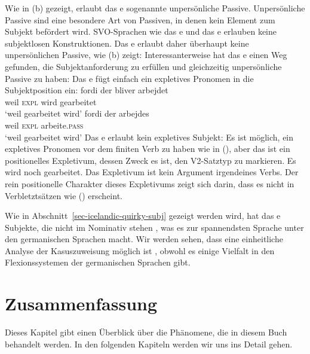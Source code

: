 Wie in (b) gezeigt, erlaubt das e sogenannte unpersönliche Passive. Unpersönliche Passive sind
eine besondere Art von Passiven, in denen kein Element zum Subjekt befördert wird. SVO-Sprachen wie das e und
das e erlauben keine subjektlosen Konstruktionen. Das e erlaubt daher überhaupt keine unpersönlichen Passive,
wie (b) zeigt:
\eal
{}
\zl
Interessanterweise hat das e einen Weg gefunden, die Subjektanforderung zu erfüllen und gleichzeitig
unpersönliche Passive zu haben: Das e fügt einfach ein expletives Pronomen in die Subjektposition ein:
\eal
\label{ex-bliver-arbejder}
\ex
\gll fordi der bliver arbejdet\\
     weil \textsc{expl} wird gearbeitet\\\danish
\glt `weil gearbeitet wird'
\ex
\gll fordi   der arbejdes\\
     weil  \textsc{expl} arbeite.\textsc{pass}\\
\glt `weil gearbeitet wird'
\zl
Das e erlaubt kein expletives Subjekt:
\z
Es ist möglich, ein expletives Pronomen vor dem finiten Verb zu haben wie in (), aber das ist
ein positionelles Expletivum, dessen Zweck es ist, den V2-Satztyp zu markieren.
\ea
Es wird noch gearbeitet.\german
\z
Das Expletivum ist kein Argument irgendeines Verbs. Der rein positionelle Charakter dieses Expletivums zeigt sich darin, dass es nicht
in Verbletztsätzen wie () erscheint.%

Wie in Abschnitt~\ref{sec-icelandic-quirky-subj} gezeigt werden wird, hat das e
Subjekte, die nicht im Nominativ stehen \citep{ZMT85a}, was es zur
spannendsten Sprache unter den germanischen Sprachen macht. Wir werden sehen, dass eine einheitliche Analyse der
Kasuszuweisung möglich ist \citep*{YMJ87}, obwohl es einige Vielfalt in den Flexionssystemen der germanischen Sprachen gibt.

\section{Zusammenfassung}

Dieses Kapitel gibt einen Überblick über die Phänomene, die in diesem Buch behandelt werden. In den
folgenden Kapiteln werden wir uns ins Detail gehen.

